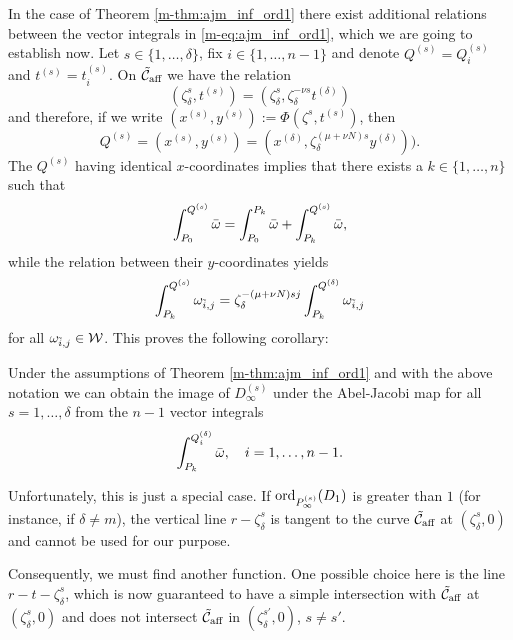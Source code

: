 \documentclass[main.tex]{subfiles}
\begin{document}
    In the case of Theorem \ref{m-thm:ajm_inf_ord1} there exist additional relations between the vector integrals in 
    \eqref{m-eq:ajm_inf_ord1}, which we are going to establish now.
    Let $s \in \{1,\dots,\delta\}$, fix $i \in \{1,\dots,n-1\}$ and denote $Q^{(s)} = Q_i^{(s)}$ and $t^{(s)} = t_i^{(s)}$.
    On $\tilde{\mathcal{C}}_{\text{aff}}$ we have the relation
     \begin{equation*}
	( \zeta_{\delta}^s,t^{(s)} ) = ( \zeta_{\delta}^s, \zeta_{\delta}^{-\nu s} t^{(\delta)} )
     \end{equation*}
     and therefore, if we write $(x^{(s)},y^{(s)}) :=  \Phi( \zeta^s,t^{(s)})$, then
     \begin{equation*}
      Q^{(s)} = (x^{(s)},y^{(s)}) = (x^{(\delta)},\zeta_{\delta}^{(\mu+\nu N)s} y^{(\delta)})).
     \end{equation*}
     The $Q^{(s)}$ having identical $x$-coordinates implies that there exists a $k \in \{1,\dots,n\}$ such that
     \begin{equation*}
      \int_{P_0}^{Q^{(s)}} \bar{\omega} =  \int_{P_0}^{P_k} \bar{\omega}  +  \int_{P_k}^{Q^{(s)}}  \bar{\omega},
     \end{equation*}
     while the relation between their $y$-coordinates yields
     \begin{equation*}
       \int_{P_k}^{Q^{(s)}} \omega_{\tilde{i},j} = \zeta_{\delta}^{-(\mu+\nu N)sj} \int_{P_k}^{Q^{(\delta)}} \omega_{\tilde{i},j} 
     \end{equation*}
     for all $\omega_{\tilde{i},j} \in \mathcal{W}$. This proves the following corollary:
     
    \begin{coro}\label{coro:ajm_inf_ord1}
    Under the assumptions of Theorem \ref{m-thm:ajm_inf_ord1} and with the above notation we can obtain the
    image of $D_{\infty}^{(s)}$ under the Abel-Jacobi map
    for all $s = 1,\dots,\delta$ from the $n-1$ vector integrals
    \begin{equation*}
     \int_{P_k}^{Q_i^{(\delta)}} \bar{\omega}, \quad i = 1,\dots,n-1.
    \end{equation*}
    \end{coro}
   

    \bigskip
    
    Unfortunately, this is just a special case. If $\operatorname{ord}_{P_{\infty}^{(s)}}(D_1)$ is greater than $1$ (for instance, if $\delta \ne m$),
     the vertical line $r-\zeta_{\delta}^s$ is tangent to the curve $\tilde{\mathcal{C}}_{\text{aff}}$ 
    at $(\zeta_{\delta}^s,0)$ and cannot be used for our purpose.
    
    Consequently, we must find another function. One possible choice here is the line $r - t -  \zeta_{\delta}^s$, which
    is now guaranteed to have a simple intersection with $\tilde{\mathcal{C}}_{\text{aff}}$ 
    at $(\zeta_{\delta}^s,0)$ and does not intersect $\tilde{\mathcal{C}}_{\text{aff}}$ in $(\zeta_{\delta}^{s'},0)$, $s \ne s'$.
\end{document}
